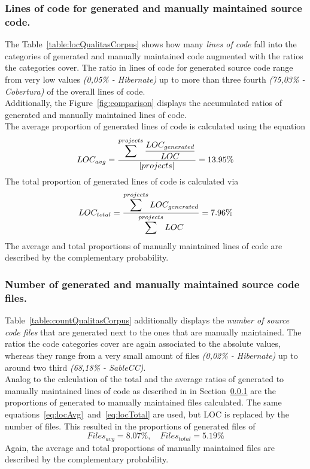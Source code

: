 \subsubsection{Lines of code for generated and manually maintained source code.}
\label{section:qualitasCorpusLOC}
The Table~\ref{table:locQualitasCorpus} shows how many \textit{lines of code} fall into the categories of generated and manually maintained code augmented with the ratios the categories cover. The ratio in lines of code for generated source code range from very low values \textit{(0,05\% - Hibernate)} up to more than three fourth \textit{(75,03\% - Cobertura)} of the overall lines of code.\\
Additionally, the Figure~\ref{fig:comparison} displays the accumulated ratios of generated and manually maintained lines of code.\\
The average proportion of generated lines of code is calculated using the equation
\begin{equation}
	\label{eq:locAvg}
	LOC_{avg} = \frac{\mathlarger{\sum^{projects} \frac{LOC_{generated}}{LOC}}}{|projects|} = 13.95\%
\end{equation}
The total proportion of generated lines of code is calculated via
\begin{equation}
	\label{eq:locTotal}
	LOC_{total} = \frac{\mathlarger{\sum^{projects} LOC_{generated}}}{\mathlarger{\sum^{projects} LOC}} = 7.96\%
\end{equation} 
The average and total proportions of manually maintained lines of code are described by the complementary probability.



\subsubsection{Number of generated and manually maintained source code files.}
Table~\ref{table:countQualitasCorpus} additionally displays the \textit{number of source code files} that are generated next to the ones that are manually maintained. The ratios the code categories cover are again associated to the absolute values, whereas they range from a very small amount of files \textit{(0,02\% - Hibernate)} up to around two third \textit{(68,18\% - SableCC)}.\\
Analog to the calculation of the total and the average ratios of generated to manually maintained lines of code as described in in Section~\ref{section:qualitasCorpusLOC} are the proportions of generated to manually maintained files calculated. The same equations~\ref{eq:locAvg}~and~\ref{eq:locTotal} are used, but LOC is replaced by the number of files. %
This resulted in the proportions of generated files of
\begin{equation}
	Files_{avg} = 8.07\%, \quad Files_{total} = 5.19\%
\end{equation} 
Again, the average and total proportions of manually maintained files are described by the complementary probability.

